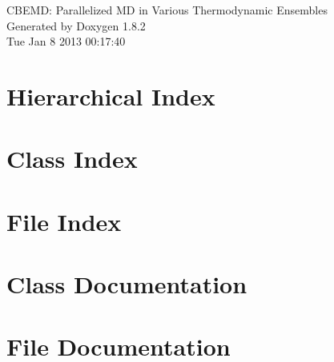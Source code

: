 \documentclass{book}
\begin{document}
\hypersetup{pageanchor=false,citecolor=blue}
\begin{titlepage}
\vspace*{7cm}
\begin{center}
{\Large C\-B\-E\-M\-D\-: Parallelized M\-D in Various Thermodynamic Ensembles }\\
\vspace*{1cm}
{\large Generated by Doxygen 1.8.2}\\
\vspace*{0.5cm}
{\small Tue Jan 8 2013 00:17:40}\\
\end{center}
\end{titlepage}
\clearemptydoublepage
{}
\tableofcontents
\clearemptydoublepage
{}
\hypersetup{pageanchor=true,citecolor=blue}
\chapter{Hierarchical Index}

\chapter{Class Index}

\chapter{File Index}

\chapter{Class Documentation}








\chapter{File Documentation}

























\printindex
\end{document}
